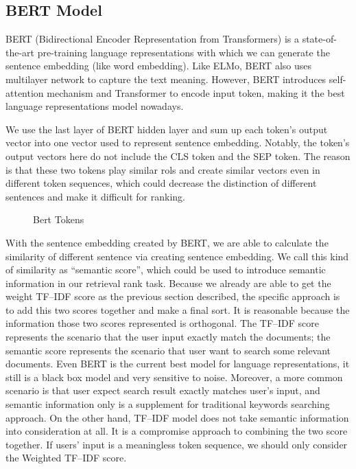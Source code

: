 \subsection{BERT Model} \label{subsec:bert}

BERT (Bidirectional Encoder Representation from Transformers) is a state-of-the-art pre-training language representations with which we can generate the sentence embedding (like word embedding). Like ELMo\cite{Peters:2018}, BERT also uses multilayer network to capture the text meaning. However, BERT introduces self-attention mechanism and Transformer\cite{Vaswani2017AttentionIA} to encode input token, making it the best language representations model nowadays.

We use the last layer of BERT hidden layer and sum up each token's output vector into one vector used to represent sentence embedding. Notably, the token's output vectors here do not include the CLS token and the SEP token. The reason is that these two tokens play similar rols and create similar vectors even in different token sequences, which could decrease the distinction of different sentences and make it difficult for ranking.

\begin{figure}[ht]
\centering

\caption{Bert Tokens}\label{fig:bert-token}
\end{figure}

With the sentence embedding created by BERT, we are able to calculate the similarity of different sentence via creating sentence embedding. We call this kind of similarity as ``semantic score'', which could be used to introduce semantic information in our retrieval rank task. Because we already are able to get the weight TF--IDF score as the previous section described, the specific approach is to add this two scores together and make a final sort. It is reasonable because the information those two scores represented is orthogonal. The TF--IDF score represents the scenario that the user input exactly match the documents; the semantic score represents the scenario that user want to search some relevant documents. Even BERT is the current best model for language representations, it still is a black box model and very sensitive to noise. Moreover, a more common scenario is that user expect search result exactly matches user's input, and semantic information only is a supplement for traditional keywords searching approach. On the other hand, TF--IDF model does not take semantic information into consideration at all. It is a compromise approach to combining the two score together. If users' input is a meaningless token sequence, we should only consider the Weighted TF--IDF score.

